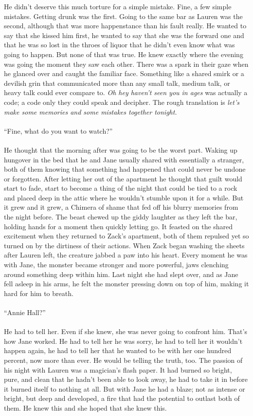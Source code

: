 \documentclass[12pt,oneside,openany]{memoir}
\begin{document}
He didn’t deserve this much torture for a simple mistake. Fine, a few simple mistakes. Getting drunk was the first. Going to the same bar as Lauren was the second, although that was more happenstance than his fault really. He wanted to say that she kissed him first, he wanted to say that she was the forward one and that he was so lost in the throes of liquor that he didn’t even know what was going to happen. But none of that was true. He knew exactly where the evening was going the moment they saw each other. There was a spark in their gaze when he glanced over and caught the familiar face. Something like a shared smirk or a devilish grin that communicated more than any small talk, medium talk, or heavy talk could ever compare to. \textit{Oh hey haven’t seen you in ages} was actually a code; a code only they could speak and decipher. The rough translation is \textit{let’s make some memories and some mistakes together tonight.}
\\\\	
“Fine, what do you want to watch?”
\\\\
He thought that the morning after was going to be the worst part. Waking up hungover in the bed that he and Jane usually shared with essentially a stranger, both of them knowing that something had happened that could never be undone or forgotten. After letting her out of the apartment he thought that guilt would start to fade, start to become a thing of the night that could be tied to a rock and placed deep in the attic where he wouldn’t stumble upon it for a while. But it grew and it grew, a Chimera of shame that fed off his blurry memories from the night before. The beast chewed up the giddy laughter as they left the bar, holding hands for a moment then quickly letting go. It feasted on the shared excitement when they returned to Zack’s apartment, both of them repulsed yet so turned on by the dirtiness of their actions. When Zack began washing the sheets after Lauren left, the creature jabbed a paw into his heart. Every moment he was with Jane, the monster became stronger and more powerful, jaws clenching around something deep within him. Last night she had slept over, and as Jane fell asleep in his arms, he felt the monster pressing down on top of him, making it hard for him to breath. 
\\\\	
“Annie Hall?”
\\\\
He had to tell her. Even if she knew, she was never going to confront him. That’s how Jane worked. He had to tell her he was sorry, he had to tell her it wouldn’t happen again, he had to tell her that he wanted to be with her one hundred percent, now more than ever. He would be telling the truth, too. The passion of his night with Lauren was a magician’s flash paper. It had burned so bright, pure, and clean that he hadn’t been able to look away, he had to take it in before it burned itself to nothing at all. But with Jane he had a blaze; not as intense or bright, but deep and developed, a fire that had the potential to outlast both of them. He knew this and she hoped that she knew this.
\end{document}

